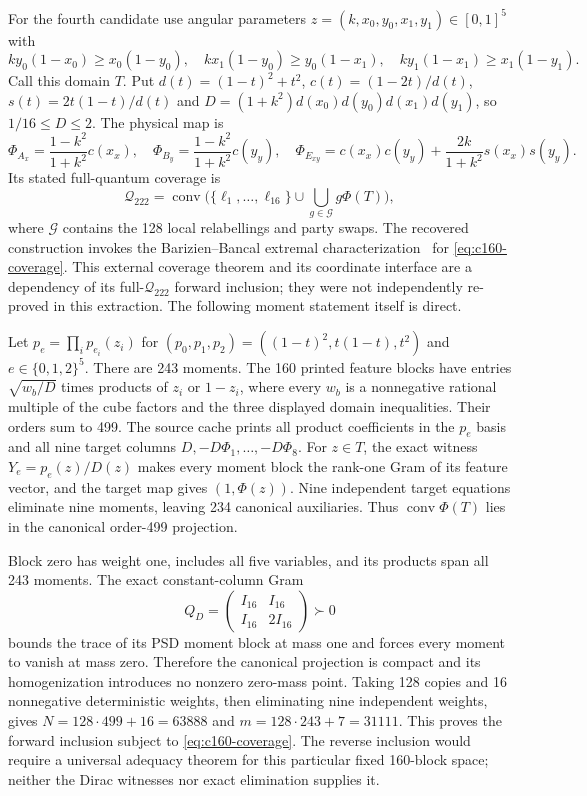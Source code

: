 \documentclass[11pt]{article}
\newcommand{\Q}{\mathcal Q_{222}}
\begin{document}
For the fourth candidate use angular parameters
$z=(k,x_0,y_0,x_1,y_1)\in[0,1]^5$ with
\[
 ky_0(1-x_0)\geq x_0(1-y_0),\quad
 kx_1(1-y_0)\geq y_0(1-x_1),\quad
 ky_1(1-x_1)\geq x_1(1-y_1).
\]
Call this domain $T$. Put $d(t)=(1-t)^2+t^2$,
$c(t)=(1-2t)/d(t)$, $s(t)=2t(1-t)/d(t)$ and
$D=(1+k^2)d(x_0)d(y_0)d(x_1)d(y_1)$, so $1/16\leq D\leq2$.
The physical map is
\[
 \Phi_{A_x}=\frac{1-k^2}{1+k^2}c(x_x),\quad
 \Phi_{B_y}=\frac{1-k^2}{1+k^2}c(y_y),\quad
 \Phi_{E_{xy}}=c(x_x)c(y_y)+\frac{2k}{1+k^2}s(x_x)s(y_y).
\]
Its stated full-quantum coverage is
\begin{equation}
 \Q=\operatorname{conv}\bigl(\{\ell_1,\ldots,\ell_{16}\}
            \cup\bigcup_{g\in\mathcal G}g\Phi(T)\bigr),
 \label{eq:c160-coverage}
\end{equation}
where $\mathcal G$ contains the 128 local relabellings and party swaps.
The recovered construction invokes the Barizien--Bancal extremal
characterization~\cite{BB} for \eqref{eq:c160-coverage}. This external coverage
theorem and its coordinate interface are a dependency of its full-$\Q$
forward inclusion; they were not independently re-proved in this
extraction. The following moment statement itself is direct.

Let $p_e=\prod_i p_{e_i}(z_i)$ for
$(p_0,p_1,p_2)=((1-t)^2,t(1-t),t^2)$ and $e\in\{0,1,2\}^5$.
There are 243 moments. The 160 printed feature blocks have entries
$\sqrt{w_b/D}$ times products of $z_i$ or $1-z_i$, where every
$w_b$ is a nonnegative rational multiple of the cube factors and the
three displayed domain inequalities. Their orders sum to 499.
The source cache prints all product coefficients in the $p_e$ basis
and all nine target columns $D,-D\Phi_1,\ldots,-D\Phi_8$.
For $z\in T$, the exact witness $Y_e=p_e(z)/D(z)$ makes every moment
block the rank-one Gram of its feature vector, and the target map gives
$(1,\Phi(z))$. Nine independent target equations eliminate nine moments,
leaving 234 canonical auxiliaries. Thus
$\operatorname{conv}\Phi(T)$ lies in the canonical order-499 projection.

Block zero has weight one, includes all five variables, and its products
span all 243 moments. The exact constant-column Gram
\[
 Q_D=\begin{pmatrix}I_{16}&I_{16}\\I_{16}&2I_{16}\end{pmatrix}\succ0
\]
bounds the trace of its PSD moment block at mass one and forces every
moment to vanish at mass zero. Therefore the canonical projection is
compact and its homogenization introduces no nonzero zero-mass point.
Taking 128 copies and 16 nonnegative deterministic weights, then
eliminating nine independent weights, gives
$N=128\cdot499+16=63888$ and $m=128\cdot243+7=31111$.
This proves the forward inclusion subject to
\eqref{eq:c160-coverage}. The reverse inclusion would require a
universal adequacy theorem for this particular fixed 160-block space;
neither the Dirac witnesses nor exact elimination supplies it.
\end{document}
